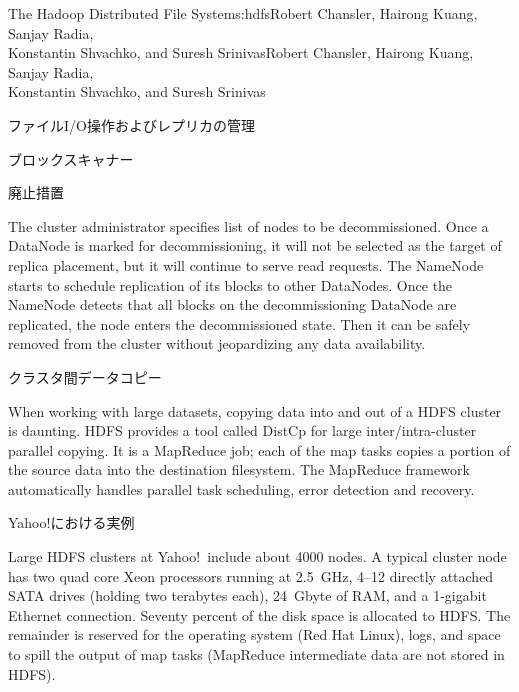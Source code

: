 \begin{aosachaptertoc}{The Hadoop Distributed File System}{s:hdfs}{Robert Chansler, Hairong Kuang, Sanjay Radia, \\ Konstantin Shvachko, and Suresh Srinivas}{Robert Chansler, Hairong Kuang, Sanjay Radia, \\ \hspace*{0.9cm} Konstantin Shvachko, and Suresh Srinivas}
\begin{aosasect1}{ファイルI/O操作およびレプリカの管理}
\begin{aosasect2}{ブロックスキャナー}
\end{aosasect2}

\begin{aosasect2}{廃止措置}

The cluster administrator specifies list of nodes to be
decommissioned.  Once a DataNode is marked for decommissioning, it
will not be selected as the target of replica placement, but it will
continue to serve read requests. The NameNode starts to schedule
replication of its blocks to other DataNodes. Once the NameNode
detects that all blocks on the decommissioning DataNode are
replicated, the node enters the decommissioned state. Then it can be
safely removed from the cluster without jeopardizing any data
availability.

\end{aosasect2}

\begin{aosasect2}{クラスタ間データコピー}

When working with large datasets, copying data into and out of a HDFS
cluster is daunting.  HDFS provides a tool called DistCp for large
inter/intra-cluster parallel copying. It is a MapReduce job; each of
the map tasks copies a portion of the source data into the destination
filesystem. The MapReduce framework automatically handles parallel
task scheduling, error detection and recovery.

\end{aosasect2}

\end{aosasect1}

\begin{aosasect1}{Yahoo!における実例}

Large HDFS clusters at Yahoo!\ include about 4000 nodes. A typical
cluster node has two quad core Xeon processors running at 2.5~GHz,
4--12 directly attached SATA drives (holding two terabytes each), 24~Gbyte of
RAM, and a 1-gigabit Ethernet connection.  Seventy percent of the disk
space is allocated to HDFS\@. The remainder is reserved for the
operating system (Red Hat Linux), logs, and space to spill the output
of map tasks (MapReduce intermediate data are not stored in HDFS).


\end{aosasect1}
\end{aosachaptertoc}
